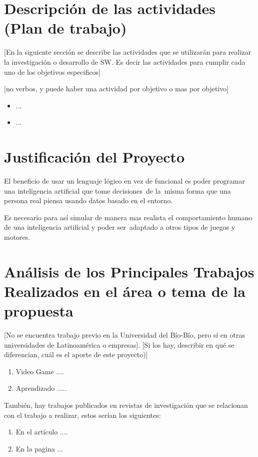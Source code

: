 \documentclass[spanish]{article}
\begin{document}
\section{Descripción de las actividades (Plan de trabajo)}

[En la siguiente sección se describe las actividades que se utilizarán para realizar la investigación o desarrollo de SW. Es decir las actividades para cumplir cada uno de los objetivos especificos]

[no verbos, y puede haber una actividad por objetivo o mas por objetivo]

\begin{itemize}
    \item ...
    \item ...
\end{itemize}


\section{Justificación del Proyecto}

El beneficio de usar un lenguaje lógico en vez de funcional es poder programar una inteligencia artificial que tome decisiones\
de la\
misma forma que una persona real piensa usando datos basado en el entorno.

Es necesario para así simular de manera mas realista el comportamiento humano de una inteligencia artificial y poder ser\
adaptado a otros tipos de juegos y motores.

\section{Análisis de los Principales Trabajos Realizados en el área o tema de la propuesta }

[No se encuentra trabajo previo en la Universidad del Bío-Bío, pero sí en otras universidades de Latinoamérica o empresas].
[Si los hay, describir en qué se diferencian, cuál es el aporte de este proyecto)]

	\begin{enumerate}
		\item Video Game ....
		\item Aprendizado .....

	\end{enumerate}

	También, hay trabajos publicados en revistas de investigación que se relacionan con el trabajo a realizar, estos serían los siguientes:
	\begin{enumerate}
		\item En el artículo ....
		\item En la pagina ...

	\end{enumerate}
\end{document}

